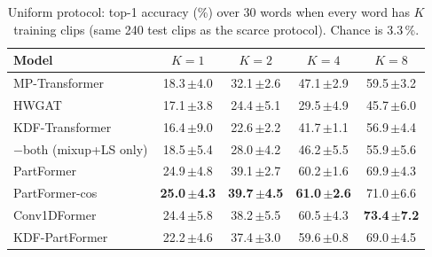 \begin{table}[t]
\centering
\small
\caption{Uniform protocol: top-1 accuracy (\%) over 30 words when every word has $K$ training clips (same 240 test clips as the scarce protocol). Chance is 3.3\,\%.}
\label{tab:uniform}
\begin{tabular}{lcccc}
\toprule
Model & $K=1$ & $K=2$ & $K=4$ & $K=8$ \\
\midrule
MP-Transformer & 18.3\,{\scriptsize$\pm$4.0} & 32.1\,{\scriptsize$\pm$2.6} & 47.1\,{\scriptsize$\pm$2.9} & 59.5\,{\scriptsize$\pm$3.2} \\
\midrule
HWGAT & 17.1\,{\scriptsize$\pm$3.8} & 24.4\,{\scriptsize$\pm$5.1} & 29.5\,{\scriptsize$\pm$4.9} & 45.7\,{\scriptsize$\pm$6.0} \\
\midrule
KDF-Transformer & 16.4\,{\scriptsize$\pm$9.0} & 22.6\,{\scriptsize$\pm$2.2} & 41.7\,{\scriptsize$\pm$1.1} & 56.9\,{\scriptsize$\pm$4.4} \\
\quad $-$both (mixup+LS only) & 18.5\,{\scriptsize$\pm$5.4} & 28.0\,{\scriptsize$\pm$4.2} & 46.2\,{\scriptsize$\pm$5.5} & 55.9\,{\scriptsize$\pm$5.6} \\
\midrule
PartFormer & 24.9\,{\scriptsize$\pm$4.8} & 39.1\,{\scriptsize$\pm$2.7} & 60.2\,{\scriptsize$\pm$1.6} & 69.9\,{\scriptsize$\pm$4.3} \\
PartFormer-cos & \textbf{25.0\,{\scriptsize$\pm$4.3}} & \textbf{39.7\,{\scriptsize$\pm$4.5}} & \textbf{61.0\,{\scriptsize$\pm$2.6}} & 71.0\,{\scriptsize$\pm$6.6} \\
Conv1DFormer & 24.4\,{\scriptsize$\pm$5.8} & 38.2\,{\scriptsize$\pm$5.5} & 60.5\,{\scriptsize$\pm$4.3} & \textbf{73.4\,{\scriptsize$\pm$7.2}} \\
KDF-PartFormer & 22.2\,{\scriptsize$\pm$4.6} & 37.4\,{\scriptsize$\pm$3.0} & 59.6\,{\scriptsize$\pm$0.8} & 69.0\,{\scriptsize$\pm$4.5} \\
\bottomrule
\end{tabular}
\end{table}

